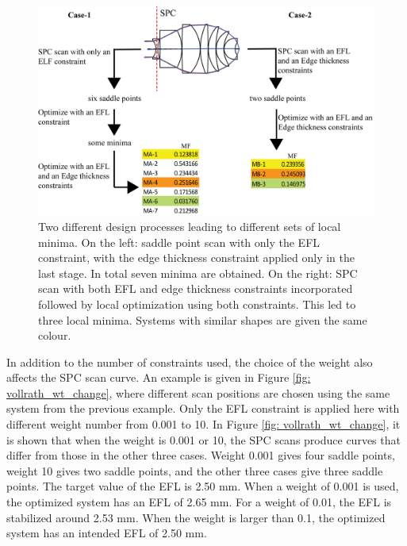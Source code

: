 \begin{figure}[h!]
    \centering
    \includegraphics[width=\textwidth]{chapter-4/figures/Vollrath_ConstraintDif_flow.png}
    \caption{Two different design processes leading to different sets of local minima. On the left: saddle point scan with only the EFL constraint, with the edge thickness constraint applied only in the last stage. In total seven minima are obtained. On the right: SPC scan with both EFL and edge thickness constraints incorporated followed by local optimization using both constraints. This led to three local minima. Systems with similar shapes are given the same colour.}
    \label{fig: vollrath_constr_flow}
\end{figure}

In addition to the number of constraints used, the choice of the weight also affects the SPC scan curve. An example is given in Figure \ref{fig: vollrath_wt_change}, where different scan positions are chosen using the same system from the previous example. Only the EFL constraint is applied here with different weight number from 0.001 to 10. In Figure \ref{fig: vollrath_wt_change}, it is shown that when the weight is 0.001 or 10, the SPC scans produce curves that differ from those in the other three cases. Weight 0.001 gives four saddle points, weight 10 gives two saddle points, and the other three cases give three saddle points. The target value of the EFL is 2.50 mm. When a weight of 0.001 is used, the optimized system has an EFL of 2.65 mm. For a weight of 0.01, the EFL is stabilized around 2.53 mm. When the weight is larger than 0.1, the optimized system has an intended EFL of 2.50 mm. 

